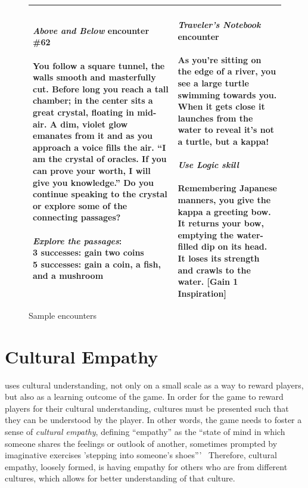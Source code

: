 \documentclass[a4paper]{article}
\begin{document}
\begin{figure}
\begin{tabular}{|p{\colwidth}|p{\colwidth}|}
{\textit{Above and Below} encounter \#62\\
\\
You follow a square tunnel, the walls smooth and masterfully cut.
Before long you reach a tall chamber; in the center sits a great crystal,
floating in mid-air. A dim, violet glow emanates from it and as you approach
a voice fills the air. ``I am the crystal of oracles. If you can prove
your worth, I will give you knowledge.'' Do you continue speaking to the
crystal or explore some of the connecting passages?\\
\\
\textit{Explore the passages}:\\
3 successes: gain two coins\\
5 successes: gain a coin, a fish, and a mushroom
}
& 
\specialcell{
\\
\textit{Traveler's Notebook} encounter\\
\\
As you're sitting on the edge of a river, you see a large turtle swimming towards you. When it gets close it launches from the water to reveal it's not a turtle, but a kappa!\\
\\
\textit{Use Logic skill}\\
\\
Remembering Japanese manners, you give the kappa a greeting bow. It returns your bow, emptying the water-filled dip on its head. It loses its strength and crawls to the water. [Gain 1 Inspiration]
}
\\\hline
\end{tabular}
\caption{Sample encounters}
\label{fig:encounters}
\end{figure}

\section{Cultural Empathy}

\totan{} uses cultural understanding, not only on a
small scale as a way to reward players, but also as a learning outcome of
the game. In order for the game to reward players for their cultural
understanding, cultures must be presented such that they can be understood
by the player. In other words, the game needs to foster a
sense of \textit{cultural empathy}, defining ``empathy'' as 
the ``state of mind in which someone shares the feelings or outlook of
another, sometimes prompted by imaginative exercises 'stepping into
someone's shoes'''~\citep[p.242]{Honderich2005}
Therefore, cultural
empathy, loosely formed, is having empathy for others who are from
different cultures, which allows for better understanding of that
culture.
\end{document}
